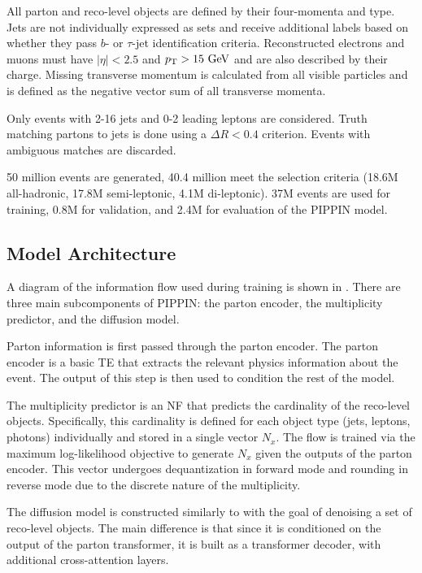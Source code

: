 All parton and reco-level objects are defined by their four-momenta and type.
Jets are not individually expressed as sets and receive additional labels based on whether they pass $b$- or $\tau$-jet identification criteria.
Reconstructed electrons and muons must have $|\eta| < 2.5$ and $\pt > 15~\GeV$ and are also described by their charge.
Missing transverse momentum \ptmiss is calculated from all visible particles and is defined as the negative vector sum of all transverse momenta.

Only events with 2-16 jets and 0-2 leading leptons are considered.
Truth matching partons to jets is done using a $\Delta R < 0.4$ criterion.
Events with ambiguous matches are discarded.

50 million events are generated, 40.4 million meet the selection criteria (18.6M all-hadronic, 17.8M semi-leptonic, 4.1M di-leptonic).
37M events are used for training, 0.8M for validation, and 2.4M for evaluation of the PIPPIN model.

\subsection{Model Architecture}

A diagram of the information flow used during training is shown in .
There are three main subcomponents of PIPPIN: the parton encoder, the multiplicity predictor, and the diffusion model.

Parton information is first passed through the parton encoder.
The parton encoder is a basic TE that extracts the relevant physics information about the event.
The output of this step is then used to condition the rest of the model.

The multiplicity predictor is an NF that predicts the cardinality of the reco-level objects.
Specifically, this cardinality is defined for each object type (jets, leptons, photons) individually and stored in a single vector $N_x$.
The flow is trained via the maximum log-likelihood objective to generate $N_x$ given the outputs of the parton encoder.
This vector undergoes dequantization in forward mode and rounding in reverse mode due to the discrete nature of the multiplicity.

The diffusion model is constructed similarly to \pcdroid with the goal of denoising a set of reco-level objects.
The main difference is that since it is conditioned on the output of the parton transformer, it is built as a transformer decoder, with additional cross-attention layers.

